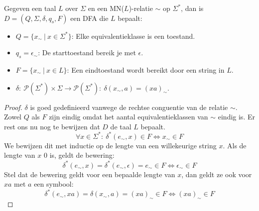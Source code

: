\documentclass[main.tex]{subfiles}
\begin{document}
\begin{st}
  \label{st:mn-relatie-naar-dfa}
  Gegeven een taal $L$ over $\Sigma$ en een MN($L$)-relatie $\sim$ op $\Sigma^{*}$, dan is $D = (Q,\Sigma,\delta,q_{s},F)$ een DFA die $L$ bepaalt:
  \begin{itemize}
  \item $Q = \{ x_{\sim}\ |\ x \in \Sigma^{*} \}$: Elke equivalentieklasse is een toestand.
  \item $q_{s} = \epsilon_{\sim}$: De starttoestand bereik je met $\epsilon$.
  \item $F = \{ x_{\sim}\ |\ x\in L \}$: Een eindtoestand wordt bereikt door een string in $L$.
  \item $\delta:\ \mathcal{P}(\Sigma^{*})\times\Sigma   \rightarrow \mathcal{P}(\Sigma^{*}):\ \delta(x_{\sim},a) = (xa)_{\sim}$.
  \end{itemize}
  \begin{proof}
    $\delta$ is goed gedefinieerd vanwege de rechtse conguentie van de relatie $\sim$.
    Zowel $Q$ als $F$ zijn eindig omdat het aantal equivalentieklassen van $\sim$ eindig is.
    Er rest ons nu nog te bewijzen dat $D$ de taal $L$ bepaalt.
    \[ \forall x\in \Sigma^{*}:\ \delta^{*}(e_{\sim},x) \in F \Leftrightarrow x_{\sim} \in F\]
    We bewijzen dit met inductie op de lengte van een willekeurige string $x$.
    Als de lengte van $x$ $0$ is, geldt de bewering:
    \[ \delta^{*}(e_{\sim},x) = \delta^{*}(e_{\sim},\epsilon) = e_{\sim} \in F \Leftrightarrow \epsilon_{\sim} \in F \]
    Stel dat de bewering geldt voor een bepaalde lengte van $x$, dan geldt ze ook voor $xa$ met $a$ een symbool:
    \[ \delta^{*}(e_{\sim},xa) = \delta(x_{\sim},a) = (xa)_{\sim} \in F \Leftrightarrow (xa)_{\sim} \in F \]
  \end{proof}
\end{st}


\end{document}
